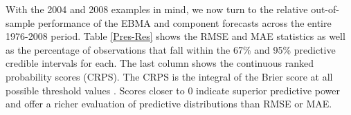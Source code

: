 \documentclass[pdftex,12pt,fullpage,oneside]{amsart}
\begin{document}


With the 2004 and 2008 examples in mind, we now turn to the relative
out-of-sample performance of the EBMA and component forecasts across
the entire 1976-2008 period.  Table \ref{Pres-Res} shows the RMSE and
MAE statistics as well as the percentage of observations that fall
within the 67\% and 95\% predictive credible intervals for each.  The
last column shows the continuous ranked probability scores (CRPS).
The CRPS is the integral of the Brier score at all possible threshold
values \citep{Hersbach:2000}.  Scores closer to 0 indicate superior
predictive power and offer a richer evaluation of predictive
distributions than RMSE or MAE.
\end{document}

